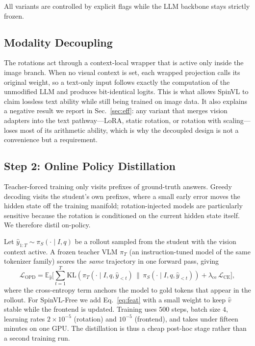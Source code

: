\documentclass[10pt,twocolumn,letterpaper]{article}
\newcommand{\modelname}{SpinVL}
\begin{document}
All variants are controlled by explicit flags while the LLM backbone stays
strictly frozen.

\subsection{Modality Decoupling}
\label{sec:decouple}

The rotations act through a context-local wrapper that is active only inside
the image branch. When no visual context is set, each wrapped projection calls
its original weight, so a text-only input follows exactly the computation of
the unmodified LLM and produces bit-identical logits. This is what allows
\modelname{} to claim lossless text ability while still being trained on image
data. It also explains a negative result we report in
Sec.~\ref{sec:eff}: any variant that merges vision adapters into the text
pathway---LoRA, static rotation, or rotation with scaling---loses most of its
arithmetic ability, which is why the decoupled design is not a convenience but
a requirement.

\subsection{Step 2: Online Policy Distillation}
\label{sec:opd}

Teacher-forced training only visits prefixes of ground-truth answers. Greedy
decoding visits the student's own prefixes, where a small early error moves
the hidden state off the training manifold; rotation-injected models are
particularly sensitive because the rotation is conditioned on the current
hidden state itself. We therefore distil on-policy.

Let $\hat y_{1:T}\sim\pi_S(\cdot\mid I,q)$ be a rollout sampled from the
student with the vision context active. A frozen teacher VLM
$\pi_T$ (an instruction-tuned model of the same tokenizer family) scores the
\emph{same} trajectory in one forward pass, giving
\begin{equation}
\mathcal{L}_{\mathrm{OPD}}=
\mathbb{E}_{\hat y}\Big[\sum_{t=1}^{T}
\mathrm{KL}\!\left(\pi_T(\cdot\mid I,q,\hat y_{<t})\,\Big\|\,
\pi_S(\cdot\mid I,q,\hat y_{<t})\right)
+\lambda_{\mathrm{ce}}\,\mathcal{L}_{\mathrm{CE}}\Big],
\label{eq:opd}
\end{equation}
where the cross-entropy term anchors the model to gold tokens that appear in
the rollout. For \modelname-Free{} we add Eq.~\eqref{eq:feat} with a small
weight to keep $\hat v$ stable while the frontend is updated. Training uses
$500$ steps, batch size $4$, learning rates $2\times10^{-5}$ (rotation) and
$10^{-5}$ (frontend), and takes under fifteen minutes on one GPU. The
distillation is thus a cheap post-hoc stage rather than a second training run.
\end{document}
